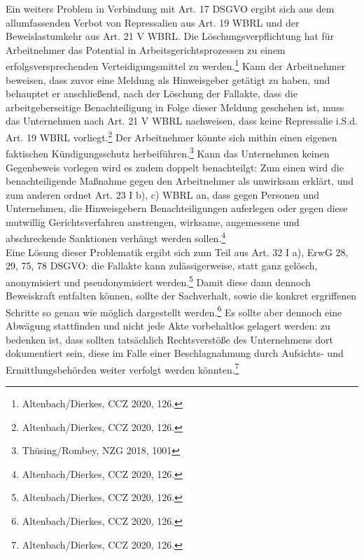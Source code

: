 Ein weiters Problem in Verbindung mit Art. 17 DSGVO ergibt sich aus dem allumfassenden Verbot von Repressalien aus Art. 19 WBRL und der Beweislastumkehr aus Art. 21 V WBRL.
Die Löschungsverpflichtung hat für Arbeitnehmer das Potential in Arbeitsgerichtsprozessen zu einem erfolgsversprechenden Verteidigungsmittel zu werden.\footnote{Altenbach/Dierkes, CCZ 2020, 126.}
Kann der Arbeitnehmer beweisen, dass zuvor eine Meldung als Hinweisgeber getätigt zu haben, und behauptet er anschließend, nach der Löschung der Fallakte, dass die arbeitgeberseitige Benachteiligung in Folge dieser Meldung geschehen ist, muss das Unternehmen nach Art. 21 V WBRL nachweisen, dass keine Repressalie i.S.d. Art. 19 WBRL vorliegt.\footnote{Altenbach/Dierkes, CCZ 2020, 126.}
Der Arbeitnehmer könnte sich mithin einen eigenen faktischen Kündigungsschutz herbeiführen.\footnote{Thüsing/Rombey, NZG 2018, 1001}
Kann das Unternehmen keinen Gegenbeweis vorlegen wird es zudem doppelt benachteilgt: Zum einen wird die benachteiligende Maßnahme gegen den Arbeitnehmer als unwirksam erklärt, und zum anderen ordnet Art. 23 I b), c) WBRL an, dass gegen Personen und Unternehmen, die Hinweisgebern Benachteiligungen auferlegen oder gegen diese mutwillig Gerichtsverfahren anstrengen, wirksame, angemessene und abschreckende Sanktionen verhängt werden sollen.\footnote{Altenbach/Dierkes, CCZ 2020, 126.}\\
Eine Lösung dieser Problematik ergibt sich zum Teil aus Art. 32 I a), ErwG 28, 29, 75, 78 DSGVO: die Fallakte kann zulässigerweise, statt ganz gelösch, anonymisiert und pseudonymisiert werden.\footnote{Altenbach/Dierkes, CCZ 2020, 126.}
Damit diese dann dennoch Beweiskraft entfalten können, sollte der Sachverhalt, sowie die konkret ergriffenen Schritte so genau wie möglich dargestellt werden.\footnote{Altenbach/Dierkes, CCZ 2020, 126.}
Es sollte aber dennoch eine Abwägung stattfinden und nicht jede Akte vorbehaltlos gelagert werden: zu bedenken ist, dass sollten tatsächlich Rechtsverstöße des Unternehmens dort dokumentiert sein,  diese im Falle einer Beschlagnahmung durch Aufsichts- und Ermittlungsbehörden weiter verfolgt werden könnten.\footnote{Altenbach/Dierkes, CCZ 2020, 126.}



